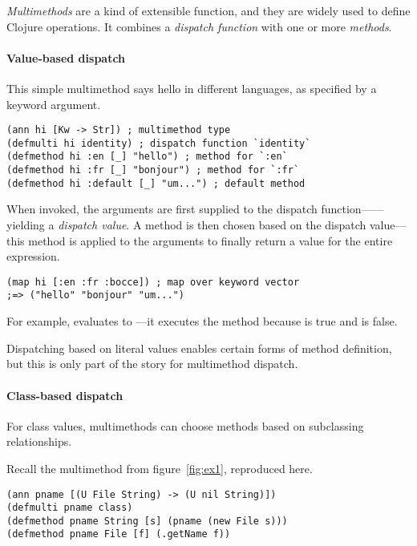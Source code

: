 \emph{Multimethods} are a kind of extensible function, and they are
widely used to define Clojure operations.  It combines a
\emph{dispatch function} with one or more \emph{methods}.

\paragraph{Value-based dispatch}
This simple multimethod says hello in different languages, as
specified by a keyword argument.

\begin{exmp}
\begin{verbatim}
(ann hi [Kw -> Str]) ; multimethod type
(defmulti hi identity) ; dispatch function `identity`
(defmethod hi :en [_] "hello") ; method for `:en`
(defmethod hi :fr [_] "bonjour") ; method for `:fr`
(defmethod hi :default [_] "um...") ; default method
\end{verbatim}
\label{example:hi-multimethod}
\end{exmp}

When invoked, the arguments are first supplied to the dispatch function------yielding
a \emph{dispatch value}. A method is then chosen
based on the dispatch value---this method is applied to the arguments
to finally return a value for the entire expression.

\begin{verbatim}
(map hi [:en :fr :bocce]) ; map over keyword vector 
;=> ("hello" "bonjour" "um...")
\end{verbatim}

For example, 
 evaluates to ---it executes
the  method
because  is true
and  is false.

Dispatching based on literal values enables certain forms of method
definition, but this is only part of the story for multimethod dispatch.

\paragraph{Class-based dispatch}
For class values, multimethods can choose methods based on subclassing
relationships.

Recall the multimethod from figure~\ref{fig:ex1}, reproduced here.
\begin{verbatim}
(ann pname [(U File String) -> (U nil String)])
(defmulti pname class)
(defmethod pname String [s] (pname (new File s)))
(defmethod pname File [f] (.getName f))
\end{verbatim}

